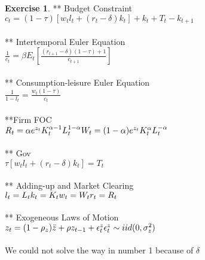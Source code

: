 \documentclass[letterpaper,12pt]{article}
\theoremstyle{definition}
\newtheorem{exercise}[theorem]{Exercise}
\begin{document}
\begin{spacing}{1.5}
	\begin{exercise}** Budget Constraint \\
$c_t = (1-\tau)[w_tl_t + (r_t-\delta)k_t] + k_t + T_t - k_{t+1}$\\
\\** Intertemporal Euler Equation\\
$\frac{1}{c_t} = \beta E_t[\frac{(r_{t+1}-\delta)(1-\tau) +1}{c_{t+1}}]$
\\
\\** Consumption-leisure Euler Equation\\
$\frac{1}{1-l_t} = \frac{w_t(1-\tau)}{c_t}$\\
\\**Firm FOC\\
$R_t = \alpha e^{z_t}K_t^{\alpha-1}L_t^{1-\alpha}\\
W_t = (1-\alpha) e^{z_t}K_t^{\alpha}L_t^{-\alpha}$
\\
\\** Gov\\
$\tau[w_tl_t + (r_t-\delta)k_t] = T_t$
\\
\\** Adding-up and Market Clearing\\
$l_t = L_t\\
k_t = K_t\\
w_t = W_t\\
r_t = R_t$
\\
\\** Exogeneous Laws of Motion\\
$z_t = (1-\rho_z)\bar{z} + \rho z_{t-1} +\epsilon_t^z\\
\epsilon_t^z \sim iid(0, \sigma_z^2) $
\\ \\
We could not solve the way in number 1 because of $\delta$
	\end{exercise}


\end{spacing}
\end{document}
